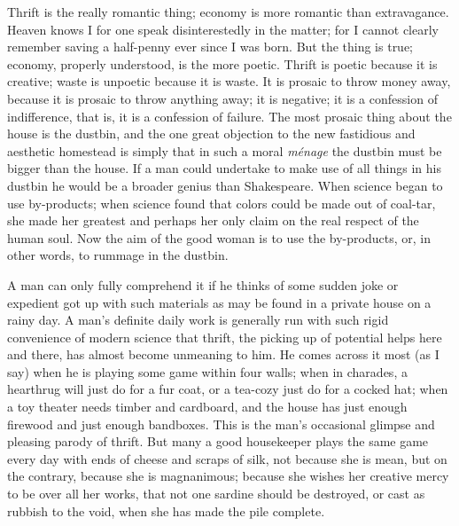 \documentclass{book}
\begin{document}
Thrift is the really romantic thing; economy is more romantic than extravagance. Heaven knows I for one speak disinterestedly in the matter; for I cannot clearly remember saving a half-penny ever since I was born. But the thing is true; economy, properly understood, is the more poetic. Thrift is poetic because it is creative; waste is unpoetic because it is waste. It is prosaic to throw money away, because it is prosaic to throw anything away; it is negative; it is a confession of indifference, that is, it is a confession of failure. The most prosaic thing about the house is the dustbin, and the one great objection to the new fastidious and aesthetic homestead is simply that in such a moral \emph{ménage} the dustbin must be bigger than the house. If a man could undertake to make use of all things in his dustbin he would be a broader genius than Shakespeare. When science began to use by-products; when science found that colors could be made out of coal-tar, she made her greatest and perhaps her only claim on the real respect of the human soul. Now the aim of the good woman is to use the by-products, or, in other words, to rummage in the dustbin.

A man can only fully comprehend it if he thinks of some sudden joke or expedient got up with such materials as may be found in a private house on a rainy day. A man’s definite daily work is generally run with such rigid convenience of modern science that thrift, the picking up of potential helps here and there, has almost become unmeaning to him. He comes across it most (as I say) when he is playing some game within four walls; when in charades, a hearthrug will just do for a fur coat, or a tea-cozy just do for a cocked hat; when a toy theater needs timber and cardboard, and the house has just enough firewood and just enough bandboxes. This is the man’s occasional glimpse and pleasing parody of thrift. But many a good housekeeper plays the same game every day with ends of cheese and scraps of silk, not because she is mean, but on the contrary, because she is magnanimous; because she wishes her creative mercy to be over all her works, that not one sardine should be destroyed, or cast as rubbish to the void, when she has made the pile complete.
\end{document}
